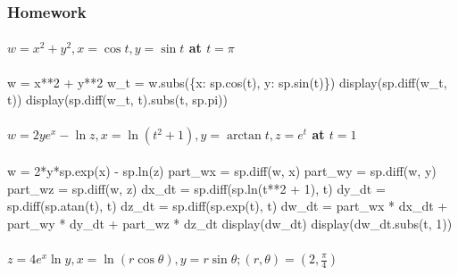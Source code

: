 \documentclass[
  letterpaper,
  DIV=11,
  numbers=noendperiod]{scrartcl}
\let\oldparagraph\paragraph
\renewcommand{\paragraph}[1]{\oldparagraph{#1}\mbox{}}
\newenvironment{Shaded}{\begin{snugshade}}{\end{snugshade}}
\newcommand{\NormalTok}[1]{\textcolor[rgb]{0.00,0.23,0.31}{#1}}
\begin{document}
\subsubsection{Homework}\label{homework-2}

\paragraph{\texorpdfstring{\(w = x^2+y^2, x=\cos t, y=\sin t\) at
\(t=\pi\)}{w = x\^{}2+y\^{}2, x=\textbackslash cos t, y=\textbackslash sin t at t=\textbackslash pi}}\label{w-x2y2-xcos-t-ysin-t-at-tpi}

\begin{Shaded}
\begin{Highlighting}[numbers=left,,]
\NormalTok{w = x**2 + y**2}
\NormalTok{w\_t = w.subs(\{x: sp.cos(t), y: sp.sin(t)\})}
\NormalTok{display(sp.diff(w\_t, t))}
\NormalTok{display(sp.diff(w\_t, t).subs(t, sp.pi))}
\end{Highlighting}
\end{Shaded}

\paragraph{\texorpdfstring{\(w = 2ye^x - \ln z, x = \ln(t^2 + 1), y = \arctan t, z=e^t\)
at
\(t=1\)}{w = 2ye\^{}x - \textbackslash ln z, x = \textbackslash ln(t\^{}2 + 1), y = \textbackslash arctan t, z=e\^{}t at t=1}}\label{w-2yex---ln-z-x-lnt2-1-y-arctan-t-zet-at-t1}

\begin{Shaded}
\begin{Highlighting}[numbers=left,,]
\NormalTok{w = 2*y*sp.exp(x) {-} sp.ln(z)}
\NormalTok{part\_wx = sp.diff(w, x)}
\NormalTok{part\_wy = sp.diff(w, y)}
\NormalTok{part\_wz = sp.diff(w, z)}
\NormalTok{dx\_dt = sp.diff(sp.ln(t**2 + 1), t)}
\NormalTok{dy\_dt = sp.diff(sp.atan(t), t)}
\NormalTok{dz\_dt = sp.diff(sp.exp(t), t)}
\NormalTok{dw\_dt = part\_wx * dx\_dt + part\_wy * dy\_dt + part\_wz * dz\_dt}
\NormalTok{display(dw\_dt)}
\NormalTok{display(dw\_dt.subs(t, 1))}
\end{Highlighting}
\end{Shaded}

\paragraph{\texorpdfstring{\(z = 4e^x\ln y, x=\ln (r\cos\theta), y=r\sin\theta; (r, \theta) = \left(2, \frac{\pi}{4}\right)\)}{z = 4e\^{}x\textbackslash ln y, x=\textbackslash ln (r\textbackslash cos\textbackslash theta), y=r\textbackslash sin\textbackslash theta; (r, \textbackslash theta) = \textbackslash left(2, \textbackslash frac\{\textbackslash pi\}\{4\}\textbackslash right)}}\label{z-4exln-y-xln-rcostheta-yrsintheta-r-theta-left2-fracpi4right}
\end{document}
